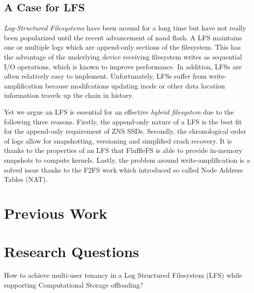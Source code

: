 \documentclass[conference]{IEEEtran}
\begin{document}
\subsection*{A Case for LFS}

\textit{Log-Structured Filesystems} have been around for a long
time\cite{Rosenblum1992TheDA} but have not really been popularized until the
recent advancement of nand flash. A LFS maintains one or multiple logs which
are append-only sections of the filesystem. This has the advantage of the
underlying device receiving filesystem writes as sequential I/O operations,
which is known to improve performance. In addition, LFSs are often relatively
easy to implement. Unfortunately, LFSs suffer from write-amplification because
modifcations updating inode or other data location information travels up the
chain in history.

Yet we argue an LFS is essential for an effective \textit{hybrid filesystem} due
to the following three reasons. Firstly, the append-only nature of a LFS is the
best fit for the append-only requirement of ZNS SSDs. Secondly, the
chronological order of logs allow for snapshotting, versioning and simplified
crash recovery. It is thanks to the properties of an LFS that FluffleFS is able
to provide in-memory snapshots to compute kernels. Lastly, the problem around
write-amplification is a solved issue thanks to the F2FS\cite{Lee2015F2FSAN}
work which introduced so called Node Address Tables (NAT).

\section{Previous Work}





\section{Research Questions}

How to achieve multi-user tenancy in a Log Structured Filesystem (LFS) while
supporting Computational Storage offloading?
\end{document}

